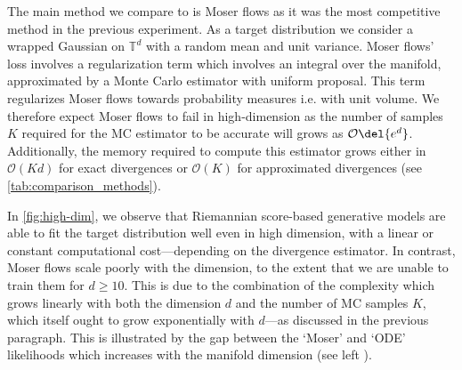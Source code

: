 The main method we compare to is Moser flows \cite{rozen2021moser} as it was the most competitive method in the previous experiment.
As a target distribution we consider a wrapped Gaussian on \(\mathbb{T}^d\) with a random mean and unit variance.
Moser flows'~\parencite{rozen2021moser} loss involves a regularization term which involves an integral over the manifold, approximated by a Monte Carlo estimator with uniform proposal.
This term regularizes Moser flows towards probability measures i.e. with unit volume.
We therefore expect Moser flows to fail in high-dimension as the number of samples \(K\) required for the MC estimator to be accurate will grows as \(\mathcal{O}\del{e^d}\).
Additionally, the memory required to compute this estimator grows either in \(\mathcal{O}(Kd)\) for exact divergences or \(\mathcal{O}(K)\) for approximated divergences (see \cref{tab:comparison_methods}).

In \cref{fig:high-dim}, we observe that Riemannian score-based generative models are able to fit the target distribution well even in high dimension, with a linear or constant computational cost---depending on the divergence estimator.
In contrast, Moser flows scale poorly with the dimension, to the extent that we are unable to train them for \(d \ge 10\).
This is due to the combination of the complexity which grows linearly with both the dimension \(d\) and the number of MC samples \(K\), which itself ought to grow exponentially with \(d\)---as discussed in the previous paragraph.
This is illustrated by the gap between the `Moser' and `ODE' likelihoods which increases with the manifold dimension (see left ).

